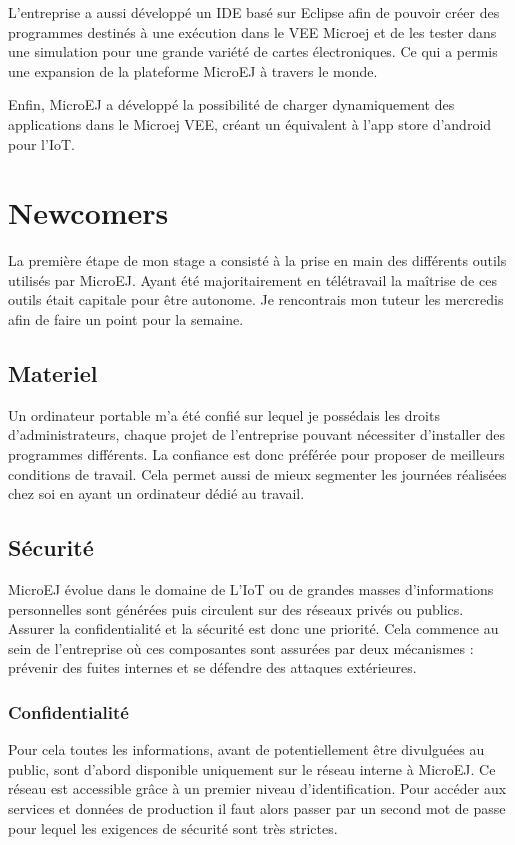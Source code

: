 \documentclass[french,a4paper,12pt]{report}
\begin{document}
L’entreprise a aussi développé un IDE basé sur Eclipse afin de pouvoir créer des programmes destinés à une exécution dans le VEE Microej et de les tester dans une simulation pour une grande variété de cartes électroniques. Ce qui a permis une expansion de la plateforme MicroEJ à travers le monde.

Enfin, MicroEJ a développé la possibilité de charger dynamiquement des applications dans le Microej VEE, créant un équivalent à l'app store d'android pour l'IoT. 

\chapter{Newcomers}

La première étape de mon stage a consisté à la prise en main des différents outils utilisés par MicroEJ. Ayant été majoritairement en télétravail la maîtrise de ces outils était capitale pour être autonome. Je rencontrais mon tuteur les mercredis afin de faire un point pour la semaine.

\section{Materiel} 

Un ordinateur portable m’a été confié sur lequel je possédais les droits d’administrateurs, chaque projet de l’entreprise pouvant nécessiter d’installer des programmes différents. La confiance est donc préférée pour proposer de meilleurs conditions de travail. Cela permet aussi de mieux segmenter les journées réalisées chez soi en ayant un ordinateur dédié au travail.

\section{Sécurité}

MicroEJ évolue dans le domaine de L'IoT ou de grandes masses d'informations personnelles sont générées puis circulent sur des réseaux privés ou publics. Assurer la confidentialité et la sécurité est donc une priorité. Cela commence au sein de l'entreprise où ces composantes sont assurées par deux mécanismes : prévenir des fuites internes et se défendre des attaques extérieures.

\subsection{Confidentialité}

Pour cela toutes les informations, avant de potentiellement être divulguées au public, sont d'abord disponible uniquement sur le réseau interne à MicroEJ. Ce réseau est accessible grâce à un premier niveau d'identification. Pour accéder aux services et données de production il faut alors passer par un second mot de passe pour lequel les exigences de sécurité sont très strictes.
\end{document}
